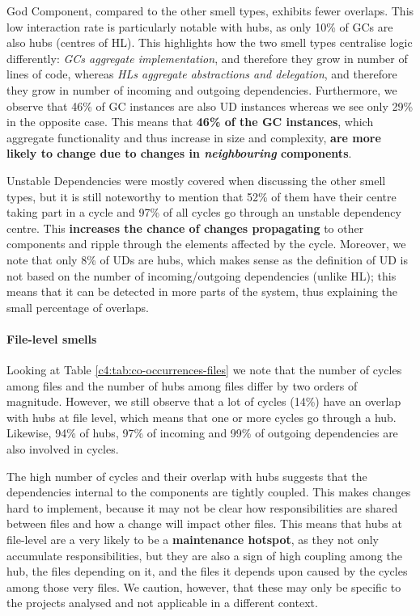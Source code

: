 God Component, compared to the other smell types, exhibits fewer overlaps.
This low interaction rate is particularly notable with hubs, as only 10\% of GCs are also hubs (centres of HL).
This highlights how the two smell types centralise logic differently: \emph{GCs aggregate implementation}, and therefore they grow in number of lines of code, whereas \emph{HLs aggregate abstractions and delegation}, and therefore they grow in number of incoming and outgoing dependencies.
Furthermore, we observe that 46\% of GC instances are also UD instances whereas we see only 29\% in the opposite case. This means that \textbf{46\% of the GC instances}, which aggregate functionality and thus increase in size and complexity, \textbf{are more likely to change due to changes in \emph{neighbouring} components}.

Unstable Dependencies were mostly covered when discussing the other smell types, but it is still noteworthy to mention that 52\% of them have their centre taking part in a cycle and 97\% of all cycles go through an unstable dependency centre.
This \textbf{increases the chance of changes propagating} to other components and ripple through the elements affected by the cycle.
Moreover, we note that only 8\% of UDs are hubs, which makes sense as the definition of UD is not based on the number of incoming/outgoing dependencies (unlike HL); this means that it can be detected in more parts of the system, thus explaining the small percentage of overlaps.

\paragraph{File-level smells}
Looking at Table \ref{c4:tab:co-occurrences-files} we note that the number of cycles among files and the number of hubs among files differ by two orders of magnitude.
However, we still observe that a lot of cycles (14\%) have an overlap with hubs at file level, which means that one or more cycles go through a hub.
Likewise, 94\% of hubs, 97\% of incoming and 99\% of outgoing dependencies are also involved in cycles.

The high number of cycles and their overlap with hubs suggests that the dependencies internal to the components are tightly coupled. This makes changes hard to implement, because it may not be clear how responsibilities are shared between files and how a change will impact other files.
This means that hubs at file-level are a very likely to be a \textbf{maintenance hotspot}, as they not only accumulate responsibilities, but they are also a sign of high coupling among the hub, the files depending on it, and the files it depends upon caused by the cycles among those very files.
We caution, however, that these may only be specific to the projects analysed and not applicable in a different context.

